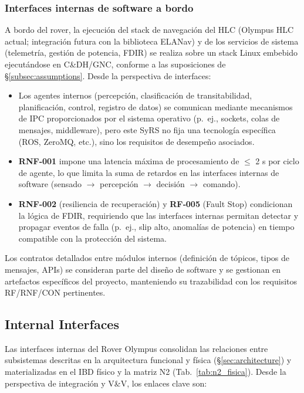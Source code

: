 \subsubsection{Interfaces internas de software a bordo}

A bordo del rover, la ejecución del stack de navegación del HLC (Olympus HLC actual; integración futura con la biblioteca ELANav) y de los servicios de sistema (telemetría, gestión de potencia, FDIR) se realiza sobre un stack Linux embebido ejecutándose en C\&DH/GNC, conforme a las suposiciones de \S\ref{subsec:assumptions}. Desde la perspectiva de interfaces:

\begin{itemize}
    \item Los agentes internos (percepción, clasificación de transitabilidad, planificación, control, registro de datos) se comunican mediante mecanismos de IPC proporcionados por el sistema operativo (p.\ ej., sockets, colas de mensajes, middleware), pero este SyRS no fija una tecnología específica (ROS, ZeroMQ, etc.), sino los requisitos de desempeño asociados.
    \item \textbf{RNF‑001} impone una latencia máxima de procesamiento de $\le$ 2 s por ciclo de agente, lo que limita la suma de retardos en las interfaces internas de software (sensado $\rightarrow$ percepción $\rightarrow$ decisión $\rightarrow$ comando).
    \item \textbf{RNF‑002} (resiliencia de recuperación) y \textbf{RF‑005} (Fault Stop) condicionan la lógica de FDIR, requiriendo que las interfaces internas permitan detectar y propagar eventos de falla (p.\ ej., slip alto, anomalías de potencia) en tiempo compatible con la protección del sistema.
\end{itemize}

Los contratos detallados entre módulos internos (definición de tópicos, tipos de mensajes, APIs) se consideran parte del diseño de software y se gestionan en artefactos específicos del proyecto, manteniendo su trazabilidad con los requisitos RF/RNF/CON pertinentes.

\subsection{Internal Interfaces}\label{subsec:internal_interfaces}

Las interfaces internas del Rover Olympus consolidan las relaciones entre subsistemas descritas en la arquitectura funcional y física (\S\ref{sec:architecture}) y materializadas en el IBD físico y la matriz N2 (Tab.~\ref{tab:n2_fisica}). Desde la perspectiva de integración y V\&V, los enlaces clave son:

